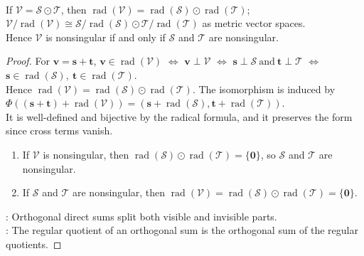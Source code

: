 \begin{proposition} \label{prop:orthogonal-sums-radicals-and-regular-quotients} \\
If $\mathcal{V}=\mathcal{S}\odot\mathcal{T}$, then $\operatorname{rad}(\mathcal{V}) =\operatorname{rad}(\mathcal{S})\odot\operatorname{rad}(\mathcal{T})$; $\mathcal{V}/\operatorname{rad}(\mathcal{V}) \cong \mathcal{S}/\operatorname{rad}(\mathcal{S}) \odot \mathcal{T}/\operatorname{rad}(\mathcal{T})$ as metric vector spaces.\\
Hence $\mathcal{V}$ is nonsingular if and only if $\mathcal{S}$ and $\mathcal{T}$ are nonsingular.
\begin{proof} For $\mathbf{v}=\mathbf{s}+\mathbf{t}$, $\mathbf{v}\in\operatorname{rad}(\mathcal{V})$ $\Longleftrightarrow$ $\mathbf{v}\perp\mathcal{V}$ $\Longleftrightarrow$ $\mathbf{s}\perp\mathcal{S}\ \text{and}\ \mathbf{t}\perp\mathcal{T}$ $\Longleftrightarrow$ $\mathbf{s}\in\operatorname{rad}(\mathcal{S}),\ \mathbf{t}\in\operatorname{rad}(\mathcal{T})$.\\
Hence $\operatorname{rad}(\mathcal{V})=\operatorname{rad}(\mathcal{S})\odot\operatorname{rad}(\mathcal{T})$. The isomorphism is induced by $\Phi((\mathbf{s}+\mathbf{t})+\operatorname{rad}(\mathcal{V})) = (\mathbf{s}+\operatorname{rad}(\mathcal{S}),\mathbf{t}+\operatorname{rad}(\mathcal{T}))$.\\
It is well-defined and bijective by the radical formula, and it preserves the form since cross terms vanish.
\begin{enumerate}[label=\roman*.]
\setlength{\itemsep}{0pt}
\item[$(\Rightarrow)$] If $\mathcal{V}$ is nonsingular, then $\operatorname{rad}(\mathcal{S})\odot\operatorname{rad}(\mathcal{T})=\{\mathbf{0}\}$, so $\mathcal{S}$ and $\mathcal{T}$ are nonsingular.
\item[$(\Leftarrow)$] If $\mathcal{S}$ and $\mathcal{T}$ are nonsingular, then $\operatorname{rad}(\mathcal{V})=\operatorname{rad}(\mathcal{S})\odot\operatorname{rad}(\mathcal{T})=\{\mathbf{0}\}$.
\end{enumerate}
: Orthogonal direct sums split both visible and invisible parts.\\
: The regular quotient of an orthogonal sum is the orthogonal sum of the regular quotients.
\end{proof}
\end{proposition}

